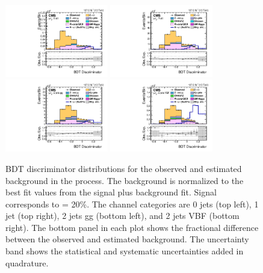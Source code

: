 \begin{figure}[htbp!]
  \centering
  \includegraphics[width=0.4\textwidth]{plots/chapter9/BDT/mutau/0jet.pdf}
  \includegraphics[width=0.4\textwidth]{plots/chapter9/BDT/mutau/1jet.pdf} \\
  \includegraphics[width=0.4\textwidth]{plots/chapter9/BDT/mutau/2jet_gg.pdf}
  \includegraphics[width=0.4\textwidth]{plots/chapter9/BDT/mutau/2jet_vbf.pdf} \\
  \caption{BDT discriminator distributions for the observed and estimated background in the \muhad process. The background is normalized to the best fit values from the signal plus background fit. Signal corresponds to \BHmt = 20\%. The \muhad channel categories are 0 jets (top left), 1 jet (top right), 2 jets gg (bottom left), and 2 jets VBF (bottom right). The bottom panel in each plot shows the fractional difference between the observed and estimated background. The uncertainty band shows the statistical and systematic uncertainties added in quadrature.}
  \label{fig:bdt_muhad}
\end{figure}

